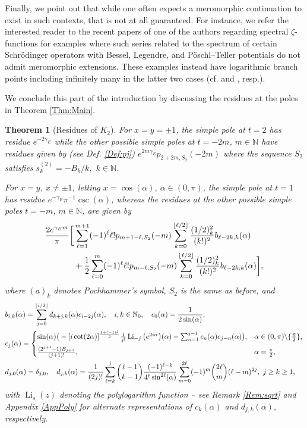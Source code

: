 \documentclass[letterpaper,10pt]{amsart}
\newtheorem{thm}{Theorem}[section]
\DeclareMathOperator{\Li}{Li}
\numberwithin{equation}{section}
\begin{document}
Finally, we point out that while one often expects a meromorphic continuation to exist in such contexts, that is not at all guaranteed. For instance, we refer the interested reader to the recent papers \cite{FPS25,FS25} of one of the authors regarding spectral $\zeta$-functions for examples where such series related to the spectrum of certain Schr\"odinger operators with Bessel, Legendre, and P\"oschl--Teller potentials do not admit meromorphic extensions. These examples instead have logarithmic branch points including infinitely many in the latter two cases (cf. \cite[Sect. 5.2]{FPS25} and \cite[Thm. 1.1]{FS25}, resp.).

We conclude this part of the introduction by discussing the residues at the poles in Theorem \ref{Thm:Main}.

\begin{thm}[Residues of $K_2$]\label{Thm:Main2}
    For $x=y=\pm1$, the simple pole at $t=2$ has residue $e^{-2\gamma_E}$ while the other possible simple poles at $t=-2m$, $m\in\mathbb{N}$ have residues given by (see Def. \ref{Def:pj}) $e^{2m\gamma_E}p_{2+2m,S_2}(-2m)$
    where the sequence $S_2$ satisfies $s_k^{(2)}=-B_k/k,$ $k\in\mathbb{N}$.

For $x=y$, $x\neq\pm1$, letting $x=\cos(\alpha),\ \alpha\in(0,\pi)$, the simple pole at $t=1$ has residue $e^{-\gamma_E}\pi^{-1}\csc(\alpha)$,
whereas the residues at the other possible simple poles $t=-m$, $m\in\mathbb{N}$, are given by
\begin{align}\label{Eq:GeneralResidues}
\frac{2e^{\gamma_E m}}{\pi}\bigg[&\sum_{\ell=1}^{m+1}(-1)^{\ell}\ell! p_{m+1-\ell,S_2}(-m)\sum_{k=0}^{\lfloor\ell/2\rfloor} \frac{(1/2)_k^2}{(k!)^2}b_{\ell-2k,k}(\alpha)\\
&+\frac{1}{2}\sum_{\ell=0}^{m}(-1)^{\ell}\ell! p_{m-\ell,S_2}(-m)\sum_{k=0}^{\lfloor\ell/2\rfloor} \frac{(1/2)_k^2}{(k!)^2}b_{\ell-2k,k}(\alpha)\bigg],\notag
\end{align}
where $(a)_k$ denotes Pochhammer's symbol, $S_2$ is the same as before, and
\begin{align}
&b_{i,k}(\alpha)=\sum_{j=0}^{\lfloor i/2\rfloor} d_{k+j,k}(\alpha)c_{i-2j}(\alpha),\quad i,k\in\mathbb{N}_0,\quad c_0(\alpha)=\frac{1}{2\sin(\alpha)},\notag\\
&c_j(\alpha)=\begin{cases}
\sin(\alpha)\big(-[i\cot(2\alpha)]^{\frac{1+(-1)^j}{2}}\frac{1}{j!}\Li_{-j}\big(e^{2i\alpha}\big)(\alpha)-\sum_{n=1}^{j-1}c_n(\alpha) c_{j-n}(\alpha)\big),& \alpha\in(0,\pi)\backslash\{\tfrac{\pi}{2}\},\\[2mm]
\frac{(2^{j+1}-1)B_{j+1}}{(j+1)!},& \alpha=\tfrac{\pi}{2},
\end{cases}\\
&d_{j,0}(\alpha)=\delta_{j,0},\quad d_{j,k}(\alpha)=\frac{1}{(2j)!}\sum_{\ell=k}^{j}\binom{\ell-1}{k-1}\frac{(-1)^{\ell-k}}{4^\ell \sin^{2\ell}(\alpha)}
\sum_{m=0}^{2\ell}
(-1)^m
\binom{2\ell}{m}
(\ell-m)^{2j},\ j\geq k\geq 1,\notag
\end{align}
with $\Li_s(z)$ denoting the polylogarithm function -- see Remark \ref{Rem:sqrt} and Appendix \ref{AppPoly} for alternate representations of $c_k(\alpha)$ and $d_{j,k}(\alpha)$, respectively.
\end{thm}
\end{document}
